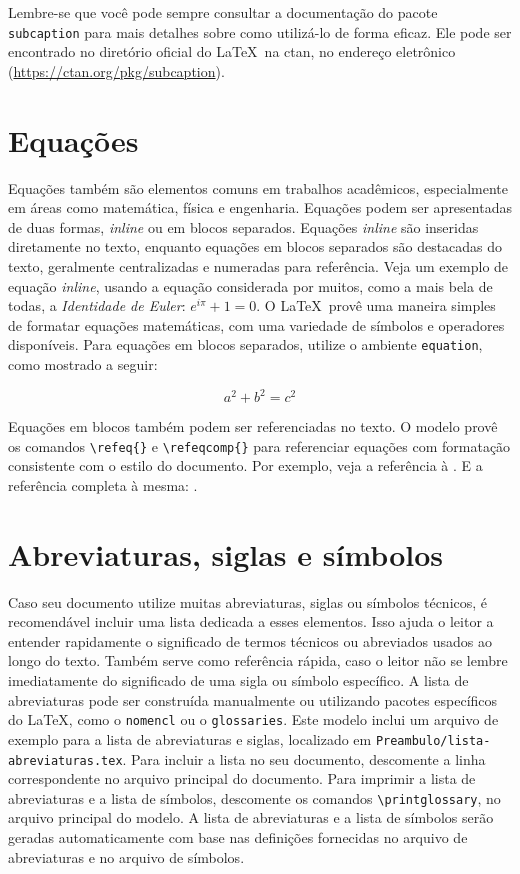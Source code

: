 Lembre-se que você pode sempre consultar a documentação do pacote \texttt{subcaption} para mais
detalhes sobre como utilizá-lo de forma eficaz. Ele pode ser encontrado no diretório oficial do
\LaTeX\, na \gls{ctan}, no endereço eletrônico (\url{https://ctan.org/pkg/subcaption}).

\section{Equações}\label{sec:equacoes}

Equações também são elementos comuns em trabalhos acadêmicos, especialmente em áreas como
matemática, física e engenharia. Equações podem ser apresentadas de duas formas, \emph{inline} ou
em blocos separados. Equações \emph{inline} são inseridas diretamente no texto, enquanto equações em
blocos separados são destacadas do texto, geralmente centralizadas e numeradas para referência. Veja
um exemplo de equação \emph{inline}, usando a equação considerada por muitos, como a mais bela de
todas, a \emph{Identidade de Euler}: \(e^{i\pi} + 1 = 0\). O \LaTeX\ provê uma maneira simples de
formatar equações matemáticas, com uma variedade de símbolos e operadores disponíveis. Para equações
em blocos separados, utilize o ambiente \texttt{equation}, como mostrado a seguir:

\begin{equation}
    a^2 + b^2 = c^2
    \label{eq:pitagoras}
\end{equation}

Equações em blocos também podem ser referenciadas no texto. O modelo provê os comandos
\verb|\refeq{}| e \verb|\refeqcomp{}| para referenciar equações com formatação consistente com o
estilo do documento. Por exemplo, veja a referência à . E a referência
completa à mesma: .

\section{Abreviaturas, siglas e símbolos}\label{sec:abreviaturas-siglas-simbolos}

Caso seu documento utilize muitas abreviaturas, siglas ou símbolos técnicos, é recomendável incluir
uma lista dedicada a esses elementos. Isso ajuda o leitor a entender rapidamente o significado de
termos técnicos ou abreviados usados ao longo do texto. Também serve como referência rápida, caso o
leitor não se lembre imediatamente do significado de uma sigla ou símbolo específico. A lista de
abreviaturas pode ser construída manualmente ou utilizando pacotes específicos do \LaTeX, como o
\texttt{nomencl} ou o \texttt{glossaries}. Este modelo inclui um arquivo de exemplo para a lista de
abreviaturas e siglas, localizado em \texttt{Preambulo/lista-abreviaturas.tex}. Para
incluir a lista no seu documento, descomente a linha correspondente no arquivo principal do
documento. Para imprimir a lista de abreviaturas e a lista de símbolos, descomente os comandos
\verb|\printglossary|, no arquivo principal do modelo. A lista de abreviaturas e a lista de símbolos
serão geradas automaticamente com base nas definições fornecidas no arquivo de abreviaturas e no
arquivo de símbolos.

